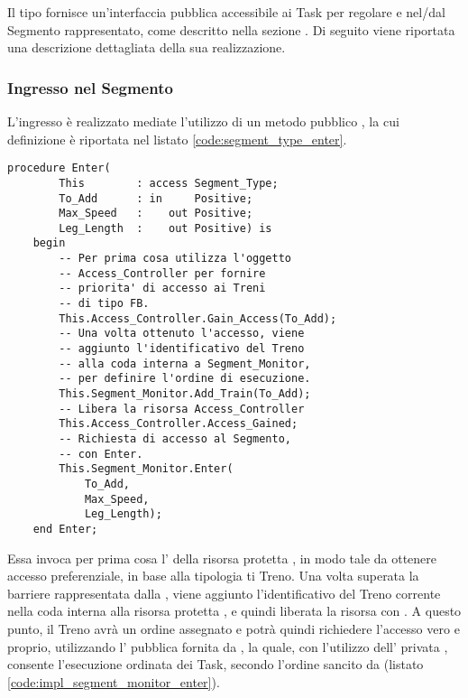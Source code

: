 	Il tipo  fornisce un'interfaccia pubblica accessibile ai Task  per regolare  e  nel/dal Segmento rappresentato, come descritto nella sezione \label{subsubsec:segment_access}. Di seguito viene riportata una descrizione dettagliata della sua realizzazione.
	
	\subsubsection{Ingresso nel Segmento}
	
	L'ingresso è realizzato mediate l'utilizzo di un metodo pubblico , la cui definizione è riportata nel listato \ref{code:segment_type_enter}.
\begin{lstlisting}[caption=\small{Metodo \ttt{Enter} del tipo \ttt{Segment\_Type}},label=code:segment_type_enter]
	procedure Enter(
		This        : access Segment_Type;
		To_Add      : in     Positive;
		Max_Speed   :    out Positive;
		Leg_Length  :	 out Positive) is
	begin
		-- Per prima cosa utilizza l'oggetto
		-- Access_Controller per fornire
		-- priorita' di accesso ai Treni
		-- di tipo FB.
		This.Access_Controller.Gain_Access(To_Add);
		-- Una volta ottenuto l'accesso, viene
		-- aggiunto l'identificativo del Treno
		-- alla coda interna a Segment_Monitor,
		-- per definire l'ordine di esecuzione.
		This.Segment_Monitor.Add_Train(To_Add);
		-- Libera la risorsa Access_Controller
		This.Access_Controller.Access_Gained;
		-- Richiesta di accesso al Segmento, 
		-- con Enter.
		This.Segment_Monitor.Enter(
			To_Add,
			Max_Speed,
			Leg_Length);
	end Enter;
\end{lstlisting}
	
	Essa invoca per prima cosa l' della risorsa protetta , in modo tale da ottenere accesso preferenziale, in base alla tipologia ti Treno. Una volta superata la barriere rappresentata dalla  , viene aggiunto l'identificativo del Treno corrente nella coda interna alla risorsa protetta , e quindi liberata la risorsa  con . A questo punto, il Treno avrà un ordine assegnato e potrà quindi richiedere l'accesso vero e proprio, utilizzando l' pubblica  fornita da , la quale, con l'utilizzo dell' privata , consente l'esecuzione ordinata dei Task, secondo l'ordine sancito da  (listato \ref{code:impl_segment_monitor_enter}).


